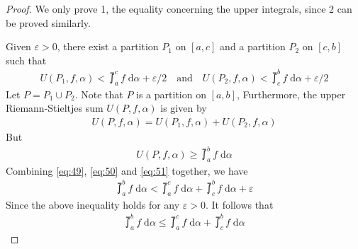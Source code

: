 \documentclass[thmcnt=section, 12pt]{my-elegantbook}
\begin{document}
\begin{proof}
    We only prove 1, the equality concerning the upper integrals, since 2 can be proved similarly.

    Given $\varepsilon > 0$, there exist a partition $P_1$ on $[a, c]$ and a partition $P_2$ on $[c, b]$ such that
    \begin{align}
        U(P_1,f,\alpha) < \upint_a^c f \; \mathrm{d}\alpha + \varepsilon/2
        \quad \text{and} \quad
        U(P_2,f,\alpha) < \upint_c^b f \; \mathrm{d}\alpha + \varepsilon/2
        \label{eq:49}
    \end{align}
    Let $P = P_1 \cup P_2$. Note that $P$ is a partition on $[a, b]$, Furthermore, the upper Riemann-Stieltjes sum $U(P,f,\alpha)$ is given by
    \begin{align}
        U(P,f,\alpha) = U(P_1,f,\alpha) + U(P_2,f,\alpha)
        \label{eq:50}
    \end{align}
    But
    \begin{align}
        U(P,f,\alpha) \geq \upint_a^b f \; \mathrm{d}\alpha
        \label{eq:51}
    \end{align}
    Combining \eqref{eq:49}, \eqref{eq:50} and \eqref{eq:51} together, we have
    \begin{align*}
        \upint_a^b f \; \mathrm{d}\alpha
        < \upint_a^c f \; \mathrm{d}\alpha + \upint_c^b f \; \mathrm{d}\alpha + \varepsilon
    \end{align*}
    Since the above inequality holds for any $\varepsilon > 0$. It follows that
    \begin{align}
        \upint_a^b f \; \mathrm{d}\alpha
        \leq \upint_a^c f \; \mathrm{d}\alpha + \upint_c^b f \; \mathrm{d}\alpha
        \label{eq:52}
    \end{align}


\end{proof}
\end{document}
